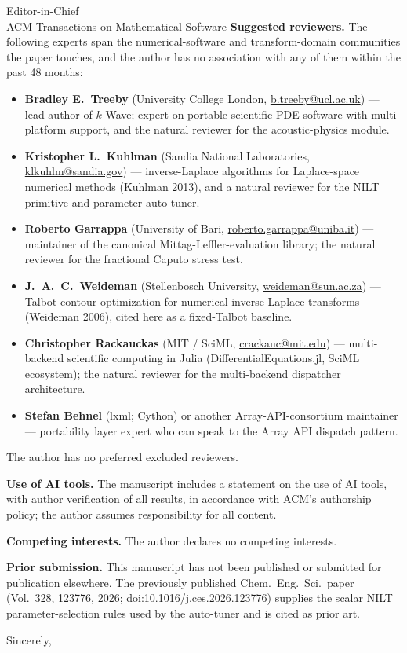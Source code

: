 \documentclass[11pt]{letter}
\begin{document}
\begin{letter}{Editor-in-Chief \\ ACM Transactions on Mathematical Software}
\medskip\noindent\textbf{Suggested reviewers.} The following experts span the numerical-software and transform-domain communities the paper touches, and the author has no association with any of them within the past 48 months:
\begin{itemize}\setlength{\itemsep}{2pt}
\item \textbf{Bradley E.\ Treeby} (University College London, \href{mailto:b.treeby@ucl.ac.uk}{b.treeby@ucl.ac.uk}) --- lead author of $k$-Wave; expert on portable scientific PDE software with multi-platform support, and the natural reviewer for the acoustic-physics module.
\item \textbf{Kristopher L.\ Kuhlman} (Sandia National Laboratories, \href{mailto:klkuhlm@sandia.gov}{klkuhlm@sandia.gov}) --- inverse-Laplace algorithms for Laplace-space numerical methods (Kuhlman 2013), and a natural reviewer for the NILT primitive and parameter auto-tuner.
\item \textbf{Roberto Garrappa} (University of Bari, \href{mailto:roberto.garrappa@uniba.it}{roberto.garrappa@uniba.it}) --- maintainer of the canonical Mittag-Leffler-evaluation library; the natural reviewer for the fractional Caputo stress test.
\item \textbf{J.\ A.\ C.\ Weideman} (Stellenbosch University, \href{mailto:weideman@sun.ac.za}{weideman@sun.ac.za}) --- Talbot contour optimization for numerical inverse Laplace transforms (Weideman 2006), cited here as a fixed-Talbot baseline.
\item \textbf{Christopher Rackauckas} (MIT / SciML, \href{mailto:crackauc@mit.edu}{crackauc@mit.edu}) --- multi-backend scientific computing in Julia (DifferentialEquations.jl, SciML ecosystem); the natural reviewer for the multi-backend dispatcher architecture.
\item \textbf{Stefan Behnel} (lxml; Cython) or another Array-API-consortium maintainer --- portability layer expert who can speak to the Array API dispatch pattern.
\end{itemize}
The author has no preferred excluded reviewers.

\medskip\noindent\textbf{Use of AI tools.} The manuscript includes a statement on the use of AI tools, with author verification of all results, in accordance with ACM's authorship policy; the author assumes responsibility for all content.

\medskip\noindent\textbf{Competing interests.} The author declares no competing interests.

\medskip\noindent\textbf{Prior submission.} This manuscript has not been published or submitted for publication elsewhere. The previously published Chem.\ Eng.\ Sci.\ paper (Vol.~328, 123776, 2026; \href{https://doi.org/10.1016/j.ces.2026.123776}{doi:10.1016/j.ces.2026.123776}) supplies the scalar NILT parameter-selection rules used by the auto-tuner and is cited as prior art.

\closing{Sincerely,}

\end{letter}
\end{document}
